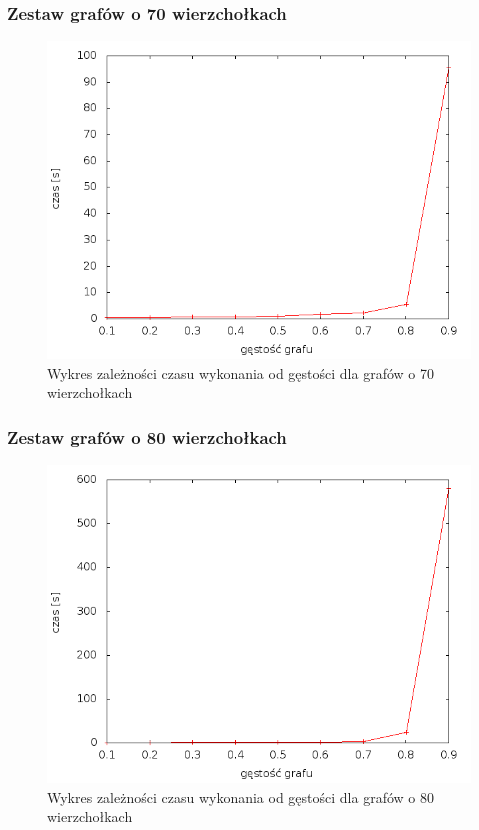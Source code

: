 \documentclass[12pt, a4paper]{article}
\begin{document}
\subsubsection*{Zestaw grafów o 70 wierzchołkach}
\begin{figure}[!h]
    \begin{center}
	\includegraphics[scale=0.5]{results//img/dim/dim_70.png}
	\caption{Wykres zależności czasu wykonania od gęstości dla grafów o 70 wierzchołkach}
    \end{center}
\end{figure}
\FloatBarrier
\subsubsection*{Zestaw grafów o 80 wierzchołkach}
\begin{figure}[!h]
    \begin{center}
	\includegraphics[scale=0.5]{results/img/dim/dim_80.png}
	\caption{Wykres zależności czasu wykonania od gęstości dla grafów o 80 wierzchołkach}
    \end{center}
\end{figure}
\FloatBarrier
\newpage
\end{document}
